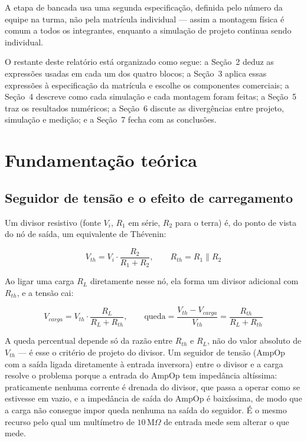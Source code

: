 \documentclass[11pt,a4paper]{article}
\begin{document}
A etapa de bancada usa uma segunda especificação, definida pelo número da equipe na turma, não
pela matrícula individual — assim a montagem física é comum a todos os integrantes, enquanto a
simulação de projeto continua sendo individual.

O restante deste relatório está organizado como segue: a Seção~2 deduz as expressões usadas em
cada um dos quatro blocos; a Seção~3 aplica essas expressões à especificação da matrícula e
escolhe os componentes comerciais; a Seção~4 descreve como cada simulação e cada montagem foram
feitas; a Seção~5 traz os resultados numéricos; a Seção~6 discute as divergências entre projeto,
simulação e medição; e a Seção~7 fecha com as conclusões.

\section{Fundamentação teórica}

\subsection{Seguidor de tensão e o efeito de carregamento}

Um divisor resistivo (fonte $V_i$, $R_1$ em série, $R_2$ para o terra) é, do ponto de vista do
nó de saída, um equivalente de Thévenin:

\begin{equation}
V_{th} = V_i \cdot \frac{R_2}{R_1+R_2}, \qquad R_{th} = R_1 \parallel R_2
\label{eq:thevenin}
\end{equation}

Ao ligar uma carga $R_L$ diretamente nesse nó, ela forma um divisor adicional com $R_{th}$, e a
tensão cai:

\begin{equation}
V_{carga} = V_{th}\cdot\frac{R_L}{R_L+R_{th}}, \qquad
\text{queda} = \frac{V_{th}-V_{carga}}{V_{th}} = \frac{R_{th}}{R_L+R_{th}}
\label{eq:queda}
\end{equation}

A queda percentual depende só da razão entre $R_{th}$ e $R_L$, não do valor absoluto de
$V_{th}$ — é esse o critério de projeto do divisor. Um seguidor de tensão (AmpOp com a saída
ligada diretamente à entrada inversora) entre o divisor e a carga resolve o problema porque a
entrada do AmpOp tem impedância altíssima: praticamente nenhuma corrente é drenada do divisor,
que passa a operar como se estivesse em vazio, e a impedância de saída do AmpOp é baixíssima, de
modo que a carga não consegue impor queda nenhuma na saída do seguidor. É o mesmo recurso pelo
qual um multímetro de $10\,\text{M}\Omega$ de entrada mede sem alterar o que mede.
\end{document}
